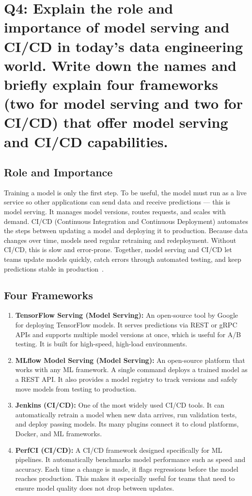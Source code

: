 \section{Q4: Explain the role and importance of model serving and CI/CD in today’s data 
engineering world. Write down the names and briefly explain four frameworks (two 
for model serving and two for CI/CD) that offer model serving and CI/CD 
capabilities.}

\subsection*{Role and Importance}

Training a model is only the first step. To be useful, the model must run as a live service so other applications can send data and receive predictions --- this is model serving. It manages model versions, routes requests, and scales with demand. CI/CD (Continuous Integration and Continuous Deployment) automates the steps between updating a model and deploying it to production. Because data changes over time, models need regular retraining and redeployment. 
Without CI/CD, this is slow and error-prone. Together, model serving and CI/CD let teams update models quickly, catch errors through automated testing, and keep predictions stable in production~\cite{qian2020orchestrating, verbraeken2020survey}.

\subsection*{Four Frameworks}

\begin{enumerate}
  \item \textbf{TensorFlow Serving (Model Serving):} An open-source tool by Google for deploying TensorFlow models. It serves predictions via REST or gRPC APIs and supports multiple model versions at once, which is useful for A/B testing. It is built for high-speed, high-load environments.

  \item \textbf{MLflow Model Serving (Model Serving):} An open-source platform that works with any ML framework. A single command deploys a trained model as a REST API. It also provides a model registry to track versions and safely move models from testing to production.

  \item \textbf{Jenkins (CI/CD):} One of the most widely used CI/CD tools. It can automatically retrain a model when new data arrives, run validation tests, and deploy passing models. Its many plugins connect it to cloud platforms, Docker, and ML frameworks.

  \item \textbf{PerfCI (CI/CD):} A CI/CD framework designed specifically for ML pipelines. It automatically benchmarks model performance such as speed and accuracy. Each time a change is made, it flags regressions before the model reaches production. This makes it especially useful for teams that need to ensure model quality does not drop between updates.
\end{enumerate}

